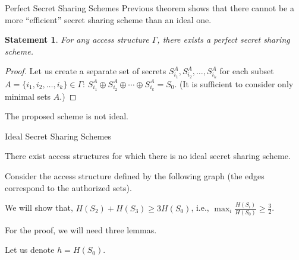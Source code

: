\documentclass[aspectratio=169]{beamer}
\newtheorem{statement}{Statement}
\newcommand{\seqn}[2]{{#1}_1,{#1}_2,\dotsc,{#1}_{#2}}
\begin{document}
\begin{frame}{Perfect Secret Sharing Schemes}
        Previous theorem shows that there cannot be a more ``efficient'' secret sharing scheme than an ideal one.

    \begin{statement}
        For any access structure $\Gamma$, there exists a perfect secret sharing scheme.
    \end{statement}

    \begin{proof}
        Let us create a separate set of secrets $S^A_{i_1}, S^A_{i_2}, \dotsc, S^A_{i_k}$ for each subset
        $A = \{\seqn{i}{k}\} \in \Gamma$: $S^A_{i_1} \oplus S^A_{i_2} \oplus \dotsb \oplus S^A_{i_k} = S_0$.
        (It is sufficient to consider only minimal sets $A$.)
    \end{proof}

        The proposed scheme is not ideal.


\end{frame}

\begin{frame}{Ideal Secret Sharing Schemes}
    \begin{theorem}
        There exist access structures for which there is no ideal secret sharing scheme.
    \end{theorem}

    Consider the access structure defined by the following graph (the edges correspond to the authorized
    sets).
    \begin{center}
    \end{center}
    We will show that, $H(S_2) + H(S_3) \ge 3H(S_0)$, i.e.,
    $\max_i \frac{H(S_i)}{H(S_0)} \ge \frac{3}{2}$.

    For the proof, we will need three lemmas.

    Let us denote $h = H(S_0)$.
\end{frame}
\end{document}
